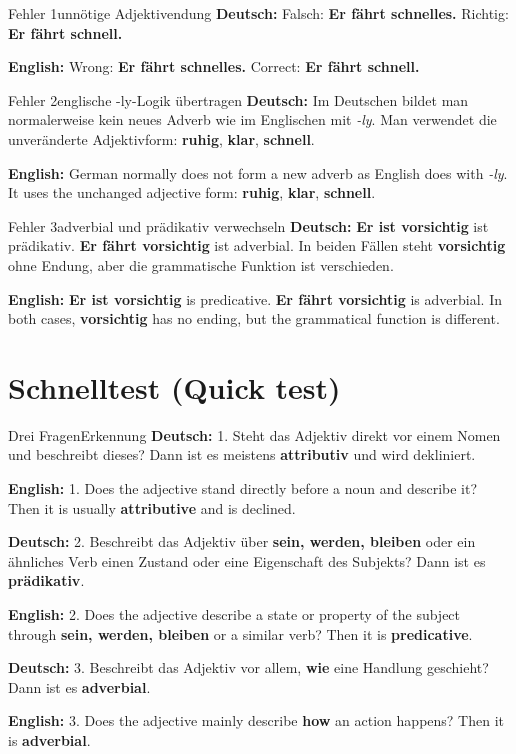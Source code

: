 \documentclass[a4paper,11pt]{article}
\newcommand{\GermanText}[1]{\textbf{Deutsch: }#1\par}
\newcommand{\EnglishText}[1]{{\small\color{SoftGray}\textbf{English: }#1\par}}
\begin{document}
        \begin{grammarentry}{Fehler 1}{unnötige Adjektivendung}
            \GermanText{Falsch: \textbf{Er fährt schnelles.} Richtig: \textbf{Er fährt schnell.}}
            \EnglishText{Wrong: \textbf{Er fährt schnelles.} Correct: \textbf{Er fährt schnell.}}
        \end{grammarentry}

        \begin{grammarentry}{Fehler 2}{englische -ly-Logik übertragen}
            \GermanText{Im Deutschen bildet man normalerweise kein neues Adverb wie im Englischen mit \textit{-ly}. Man verwendet die unveränderte Adjektivform: \textbf{ruhig}, \textbf{klar}, \textbf{schnell}.}
            \EnglishText{German normally does not form a new adverb as English does with \textit{-ly}. It uses the unchanged adjective form: \textbf{ruhig}, \textbf{klar}, \textbf{schnell}.}
        \end{grammarentry}

        \begin{grammarentry}{Fehler 3}{adverbial und prädikativ verwechseln}
            \GermanText{\textbf{Er ist vorsichtig} ist prädikativ. \textbf{Er fährt vorsichtig} ist adverbial. In beiden Fällen steht \textbf{vorsichtig} ohne Endung, aber die grammatische Funktion ist verschieden.}
            \EnglishText{\textbf{Er ist vorsichtig} is predicative. \textbf{Er fährt vorsichtig} is adverbial. In both cases, \textbf{vorsichtig} has no ending, but the grammatical function is different.}
        \end{grammarentry}

    \section{Schnelltest \textnormal{(Quick test)}}

        \begin{grammarentry}{Drei Fragen}{Erkennung}
            \GermanText{1. Steht das Adjektiv direkt vor einem Nomen und beschreibt dieses? Dann ist es meistens \textbf{attributiv} und wird dekliniert.}
            \EnglishText{1. Does the adjective stand directly before a noun and describe it? Then it is usually \textbf{attributive} and is declined.}

            \GermanText{2. Beschreibt das Adjektiv über \textbf{sein, werden, bleiben} oder ein ähnliches Verb einen Zustand oder eine Eigenschaft des Subjekts? Dann ist es \textbf{prädikativ}.}
            \EnglishText{2. Does the adjective describe a state or property of the subject through \textbf{sein, werden, bleiben} or a similar verb? Then it is \textbf{predicative}.}

            \GermanText{3. Beschreibt das Adjektiv vor allem, \textbf{wie} eine Handlung geschieht? Dann ist es \textbf{adverbial}.}
            \EnglishText{3. Does the adjective mainly describe \textbf{how} an action happens? Then it is \textbf{adverbial}.}
        \end{grammarentry}
\end{document}
